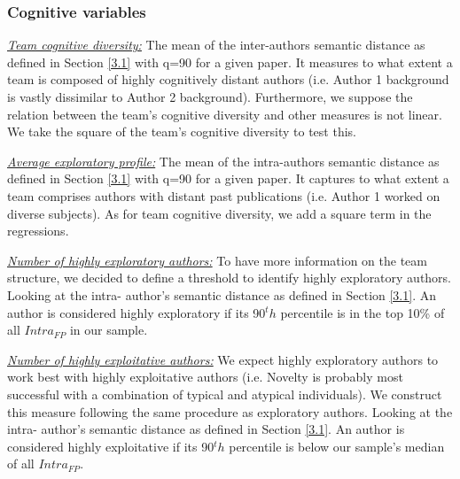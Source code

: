 

\subsubsection*{Cognitive variables}

\noindent\textit{\underline{Team cognitive diversity:}}
The mean of the inter-authors semantic distance as defined in Section \ref{3.1} with q=90 for a given paper. It measures to what extent a team is composed of highly cognitively distant authors (i.e. Author 1 background is vastly dissimilar to Author 2 background). Furthermore, we suppose the relation between the team's cognitive diversity and other measures is not linear. We take the square of the team's cognitive diversity to test this.
\newline

\noindent\textit{\underline{Average exploratory profile:}}
The mean of the intra-authors semantic distance as defined in Section \ref{3.1} with q=90 for a given paper. It captures to what extent a team comprises authors with distant past publications (i.e. Author 1 worked on diverse subjects). As for team cognitive diversity, we add a square term in the regressions.
\newline

\noindent\textit{\underline{Number of highly exploratory authors:}}
To have more information on the team structure, we decided to define a threshold to identify highly exploratory authors. Looking at the intra- author's semantic distance as defined in Section \ref{3.1}. An author is considered highly exploratory if its 90$^th$ percentile is in the top 10\% of all $Intra_{FP}$ in our sample. \newline

\noindent\textit{\underline{Number of highly exploitative authors:}}
We expect highly exploratory authors to work best with highly exploitative authors (i.e. Novelty is probably most successful with a combination of typical and atypical individuals). We construct this measure following the same procedure as exploratory authors. Looking at the intra- author's semantic distance as defined in Section \ref{3.1}. An author is considered highly exploitative if its 90$^th$ percentile is below our sample's median of all $Intra_{FP}$. \newline

